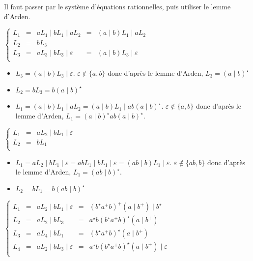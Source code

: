 \begin{corrections}

  Il faut passer par le système d'équations rationnelles, puis utiliser le lemme d'Arden.
  
  \begin{questions}
  \item $\left\{\begin{array}{lllll}
    L_1 & = & a L_1 \mid b L_1 \mid a L_2  & = & (a\mid b)L_1 \mid a L_2\\
    L_2 & = & b L_3 \\
    L_3 & = & a L_3 \mid b L_3 \mid \varepsilon & = & (a\mid b)L_3 \mid \varepsilon\\
  \end{array}\right.$
    
    \begin{itemize}
    \item $L_3 = (a\mid b)L_3 \mid \varepsilon$. $\varepsilon\notin\{a, b\}$ donc d'après le lemme d'Arden, $L_3 = (a\mid b)^\star$ 
    \item $L_2 = b L_3 = b (a\mid b)^\star$
    \item $L_1 = (a\mid b)L_1 \mid a L_2 = (a\mid b)L_1 \mid a b (a\mid b)^\star$. $\varepsilon\notin\{a, b\}$ donc d'après le lemme d'Arden, $L_1 = (a\mid b)^\star ab (a\mid b)^\star$.
    \end{itemize}
    
  \item $\left\{\begin{array}{lll}
    L_1 & = & a L_2 \mid b L_1 \mid \varepsilon\\
    L_2 & = & b L_1 \\
  \end{array}\right.$
    
    \begin{itemize}
    \item $L_1 = a L_2 \mid b L_1 \mid \varepsilon = a b L_1 \mid b L_1 \mid \varepsilon = (a b \mid b) L_1 \mid \varepsilon$.
      $\varepsilon\notin\{ab, b\}$ donc d'après le lemme d'Arden, $L_1 = (ab \mid b)^\star$.
    \item $L_2 = b L_1 = b(ab \mid b)^\star$
    \end{itemize}

  \item
    $\left\{\begin{array}{lllll}
    L_1 & = & a L_2 \mid b L_1 \mid\varepsilon &=& (b^\star a^+ b)^+ (a \mid b^+) \mid b^\star \\ 
    L_2 & = & a L_2 \mid b L_3                 &=& a^\star b (b^\star a^+ b)^\star (a \mid b^+)\\ 
    L_3 & = & a L_4 \mid b L_1                 &=& (b^\star a^+ b)^\star (a \mid b^+) \\ 
    L_4 & = & a L_2 \mid b L_3 \mid\varepsilon &=& a^\star b (b^\star a^+ b)^\star (a \mid b^+) \mid \varepsilon\\ 
  \end{array}\right.$
    

\end{questions}
\end{corrections}
